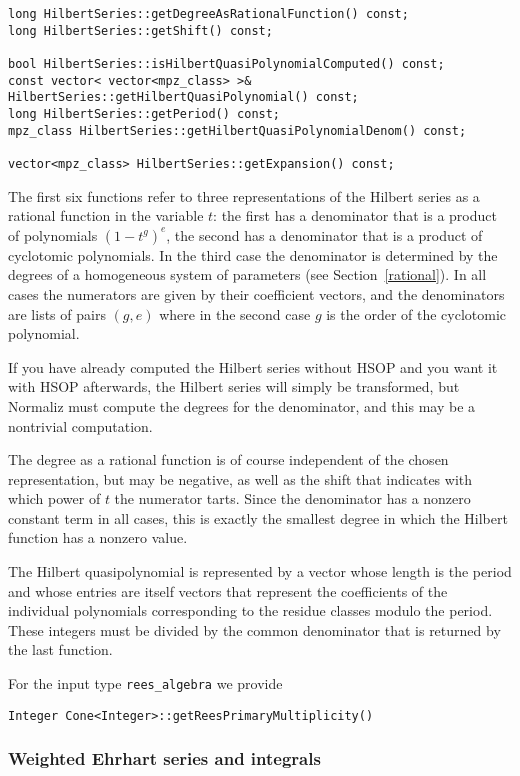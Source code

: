 \documentclass[12pt,a4paper]{scrartcl}
\theoremstyle{definition}
\begin{document}
\begin{small}
\begin{Verbatim}
long HilbertSeries::getDegreeAsRationalFunction() const;
long HilbertSeries::getShift() const;

bool HilbertSeries::isHilbertQuasiPolynomialComputed() const;
const vector< vector<mpz_class> >& HilbertSeries::getHilbertQuasiPolynomial() const;
long HilbertSeries::getPeriod() const;
mpz_class HilbertSeries::getHilbertQuasiPolynomialDenom() const;

vector<mpz_class> HilbertSeries::getExpansion() const;
\end{Verbatim}

The first six functions refer to three representations of the Hilbert series as a rational function in the variable $t$: the first has a denominator that is a product of polynomials $(1-t^g)^e$, the second has a denominator that is a product of cyclotomic polynomials. In the third case the denominator is determined by the degrees of a homogeneous system of parameters (see Section~\ref{rational}). In all cases the numerators are given by their coefficient vectors, and the denominators are lists of pairs $(g,e)$ where in the second case $g$ is the order of the cyclotomic polynomial.

If you have already computed the Hilbert series without HSOP and you want it with HSOP afterwards, the Hilbert series will simply be transformed, but Normaliz must compute the degrees for the denominator, and this may be a nontrivial computation.

The degree as a rational function is of course independent of the chosen representation, but may be negative, as well as the shift that indicates with which power of $t$ the numerator tarts. Since the denominator has a nonzero constant term in all cases, this is exactly the smallest degree in which the Hilbert function has a nonzero value.

The Hilbert quasipolynomial is represented by a vector whose length is the period and whose entries are itself vectors that represent the coefficients of the individual polynomials corresponding to the residue classes modulo the period. These integers must be divided by the common denominator that is returned by the last function.

For the input type \verb|rees_algebra| we provide
\begin{Verbatim}
Integer Cone<Integer>::getReesPrimaryMultiplicity()
\end{Verbatim}

\subsubsection{Weighted Ehrhart series and integrals}


\end{small}
\end{document}
